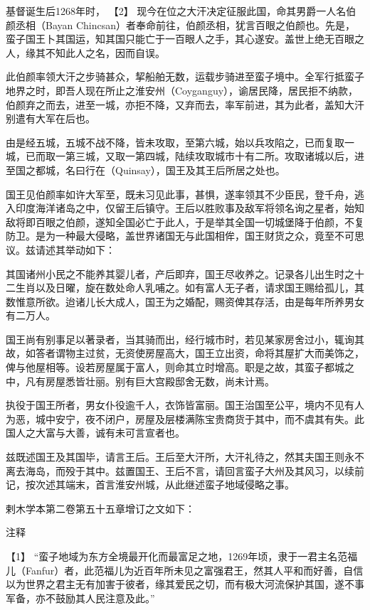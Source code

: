 \documentclass[12pt,UTF8]{ctexbook}
\begin{document}
基督诞生后1268年时， 【2】 现今在位之大汗决定征服此国，命其男爵一人名伯颜丞相（Bayan Chincsan）者奉命前往，伯颜丞相，犹言百眼之伯颜也。先是，蛮子国王卜其国运，知其国只能亡于一百眼人之手，其心遂安。盖世上绝无百眼之人，缘其不知此人之名，因而自误。

此伯颜率领大汗之步骑甚众，挈船舶无数，运载步骑进至蛮子境中。全军行抵蛮子地界之时，即吾人现在所止之淮安州（Coyganguy），谕居民降，居民拒不纳款，伯颜弃之而去，进至一城，亦拒不降，又弃而去，率军前进，其为此者，盖知大汗别遣有大军在后也。

由是经五城，五城不战不降，皆未攻取，至第六城，始以兵攻陷之，已而复取一城，已而取一第三城，又取一第四城，陆续攻取城市十有二所。攻取诸城以后，进至国之都城，名曰行在（Quinsay），国王及其王后所居之处也。

国王见伯颜率如许大军至，既未习见此事，甚惧，遂率领其不少臣民，登千舟，逃入印度海洋诸岛之中，仅留王后镇守。王后以胜败事及敌军将领名询之星者，始知敌将即百眼之伯颜，遂知全国必亡于此人，于是举其全国一切城堡降于伯颜，不复防卫。是为一种最大侵略，盖世界诸国无与此国相侔，国王财货之众，竟至不可思议。兹请述其举动如下：

其国诸州小民之不能养其婴儿者，产后即弃，国王尽收养之。记录各儿出生时之十二生肖以及日曜，旋在数处命人乳哺之。如有富人无子者，请求国王赐给孤儿，其数惟意所欲。迨诸儿长大成人，国王为之婚配，赐资俾其存活，由是每年所养男女有二万人。

国王尚有别事足以著录者，当其骑而出，经行城市时，若见某家房舍过小，辄询其故，如答者谓物主过贫，无资使房屋高大，国王立出资，命将其屋扩大而美饰之，俾与他屋相等。设若房屋属于富人，则命其立时增高。职是之故，其蛮子都城之中，凡有房屋悉皆壮丽。别有巨大宫殿邸舍无数，尚未计焉。

执役于国王所者，男女仆役逾千人，衣饰皆富丽。国王治国至公平，境内不见有人为恶，城中安宁，夜不闭户，房屋及层楼满陈宝贵商货于其中，而不虞其有失。此国人之大富与大善，诚有未可言宣者也。

兹既述国王及其国毕，请言王后。王后至大汗所，大汗礼待之，然其夫国王则永不离去海岛，而殁于其中。兹置国王、王后不言，请回言蛮子大州及其风习，以续前记，按次述其端末，首言淮安州城，从此继述蛮子地域侵略之事。

剌木学本第二卷第五十五章增订之文如下：

注释

【1】 “蛮子地域为东方全境最开化而最富足之地，1269年顷，隶于一君主名范福儿（Fanfur）者，此范福儿为近百年所未见之富强君王，然其人平和而好善，自信以为世界之君主无有加害于彼者，缘其爱民之切，而有极大河流保护其国，遂不事军备，亦不鼓励其人民注意及此。”
\end{document}
